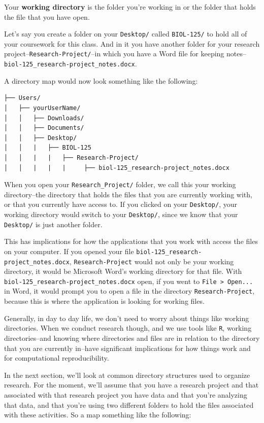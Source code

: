 \documentclass[
]{book}
\begin{document}
Your \textbf{working directory} is the folder you're working in or the folder that holds the file that you have open.

Let's say you create a folder on your \texttt{Desktop/} called \texttt{BIOL-125/} to hold all of your coursework for this class. And in it you have another folder for your research project--\texttt{Research-Project/}--in which you have a Word file for keeping notes--\texttt{biol-125\_research-project\_notes.docx}.

A directory map would now look something like the following:

\begin{verbatim}
├── Users/
│   ├── yourUserName/
│   │   ├── Downloads/
│   │   ├── Documents/
│   │   ├── Desktop/
│   │   |   ├── BIOL-125
│   │   |   |   ├── Research-Project/
│   │   |   |   |     ├── biol-125_research-project_notes.docx
\end{verbatim}

When you open your \texttt{Research\_Project/} folder, we call this your working directory--the directory that holds the files that you are currently working with, or that you currently have access to. If you clicked on your \texttt{Desktop/}, your working directory would switch to your \texttt{Desktop/}, since we know that your \texttt{Desktop/} is just another folder.

This has implications for how the applications that you work with access the files on your computer. If you opened your file \texttt{biol-125\_research-project\_notes.docx}, \texttt{Research-Project} would not only be your working directory, it would be Microsoft Word's working directory for that file. With \texttt{biol-125\_research-project\_notes.docx} open, if you went to \texttt{File\ \textgreater{}\ Open...} in Word, it would prompt you to open a file in the directory \texttt{Research-Project}, because this is where the application is looking for working files.

Generally, in day to day life, we don't need to worry about things like working directories. When we conduct research though, and we use tools like \texttt{R}, working directories--and knowing where directories and files are in relation to the directory that you are currently in--have significant implications for how things work and for computational reproducibility.

In the next section, we'll look at common directory structures used to organize research. For the moment, we'll assume that you have a research project and that associated with that research project you have data and that you're analyzing that data, and that you're using two different folders to hold the files associated with these activities. So a map something like the following:
\end{document}

